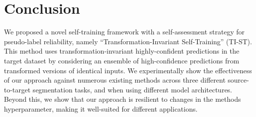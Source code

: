 \section{Conclusion}
\label{sec:tist_conclusion}

We proposed a novel self-training framework with a self-assessment strategy for pseudo-label reliability, namely ``Transformation-Invariant Self-Training'' (TI-ST). This method uses transformation-invariant highly-confident predictions in the target dataset by considering an ensemble of high-confidence predictions from transformed versions of identical inputs. We experimentally show the effectiveness of our approach against numerous existing methods across three different source-to-target segmentation tasks, and when using different model architectures. Beyond this, we show that our approach is resilient to changes in the methods hyperparameter, making it well-suited for different applications. 